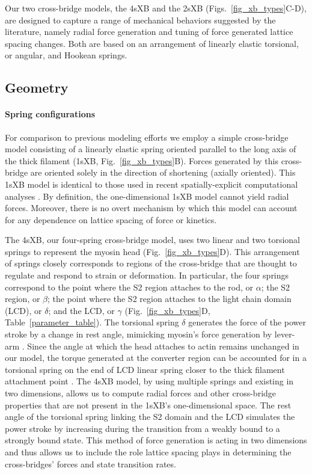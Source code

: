 \documentclass[]{article}
\begin{document}
Our two cross-bridge models, the 4sXB and the 2sXB (Figs.~\ref{fig_xb_types}C-D), are designed to capture a range of mechanical behaviors suggested by the literature, namely radial force generation and tuning of force generated lattice spacing changes.  %
Both are based on an arrangement of linearly elastic torsional, or angular, and Hookean springs.  

\subsection*{Geometry} %

\paragraph{Spring configurations} %
For comparison to previous modeling efforts we employ a simple cross-bridge model consisting of a linearly elastic spring oriented parallel to the long axis of the thick filament (1sXB, Fig.~\ref{fig_xb_types}B).  
Forces generated by this cross-bridge are oriented solely in the direction of shortening (axially oriented). 
This 1sXB model is identical to those used in recent spatially-explicit computational analyses \citep{Daniel1998, Chase2004, Tanner2007}. 
By definition, the one-dimensional 1sXB model cannot yield radial forces.  
Moreover, there is no overt mechanism by which this model can account for any dependence on lattice spacing of force or kinetics.

The 4sXB, our four-spring cross-bridge model, uses two linear and two torsional springs to represent the myosin head (Fig.~\ref{fig_xb_types}D).
This arrangement of springs closely corresponds to regions of the cross-bridge that are thought to regulate and respond to strain or deformation. 
In particular, the four springs correspond to the point where the S2 region attaches to the rod, or $\alpha$; the S2 region, or $\beta$; the point where the S2 region attaches to the light chain domain (LCD), or $\delta$; and the LCD, or $\gamma$ (Fig.~\ref{fig_xb_types}D, Table~\ref{parameter_table}). 
The torsional spring $\delta$ generates the force of the power stroke by a change in rest angle, mimicking myosin's force generation by lever-arm \citep{Houdusse2000, Houdusse2001}. 
Since the angle at which the head attaches to actin remains unchanged in our model, the torque generated at the converter region can be accounted for in a torsional spring on the end of LCD linear spring closer to the thick filament attachment point \citep{Houdusse2000}. 
The 4sXB model, by using multiple springs and existing in two dimensions,  allows us to compute radial forces and other cross-bridge properties that are not present in the 1sXB's one-dimensional space. 
The rest angle of the torsional spring linking the S2 domain and the LCD simulates the power stroke by increasing during the transition from a weakly bound to a strongly bound state.
This method of force generation is acting in two dimensions and thus allows us to include the role lattice spacing plays in determining the cross-bridges' forces and state transition rates.
\end{document}
